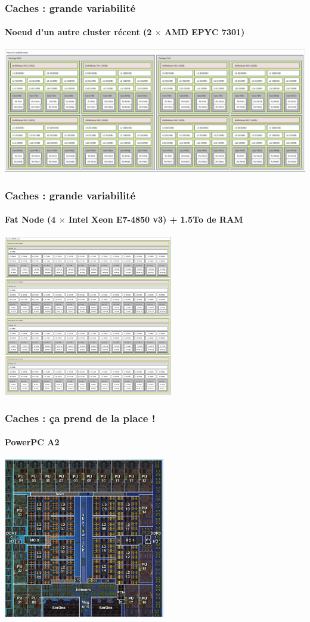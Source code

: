 \documentclass[xcolor={x11names,svgnames}]{beamer}
\begin{document}
\begin{frame}[label=caches]
  \frametitle{Caches : grande variabilité}
  \framesubtitle{Noeud d'un autre cluster récent (2 $\times$ AMD EPYC 7301)}
  \centering
  \includegraphics[width=\textwidth]{lstopo_chiclet.pdf}
\end{frame}

\begin{frame}[label=caches]
  \frametitle{Caches : grande variabilité}
  \framesubtitle{Fat Node (4 $\times$ Intel Xeon E7-4850 v3) + 1.5To de RAM}
  \centering
  \includegraphics[height=7cm]{lstopo_wurst.pdf}
\end{frame}

\begin{frame}[label=caches]
  \frametitle{Caches : ça prend de la place !}
  \framesubtitle{PowerPC A2}
  \centering
  \includegraphics[height=7cm]{die-bgq.png}
\end{frame}
\end{document}
